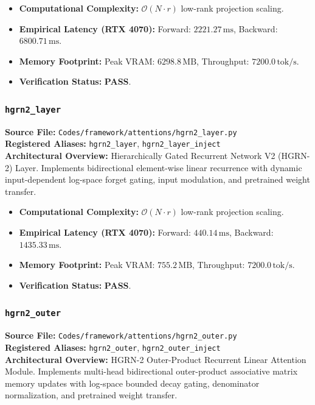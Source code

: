 \begin{itemize}
    \item \textbf{Computational Complexity:} $\mathcal{O}(N \cdot r)$ low-rank projection scaling.
    \item \textbf{Empirical Latency (RTX 4070):} Forward: $2221.27\,\text{ms}$, Backward: $6800.71\,\text{ms}$.
    \item \textbf{Memory Footprint:} Peak VRAM: $6298.8\,\text{MB}$, Throughput: $7200.0\,\text{tok/s}$.
    \item \textbf{Verification Status:} \textbf{PASS}.
\end{itemize}

\subsubsection{\texttt{hgrn2\_layer}}
\textbf{Source File:} \texttt{Codes/framework/attentions/hgrn2\_layer.py} \\
\textbf{Registered Aliases:} \texttt{hgrn2\_layer}, \texttt{hgrn2\_layer\_inject} \\
\textbf{Architectural Overview:} Hierarchically Gated Recurrent Network V2 (HGRN-2) Layer. Implements bidirectional element-wise linear recurrence with dynamic input-dependent log-space forget gating, input modulation, and pretrained weight transfer.

\begin{itemize}
    \item \textbf{Computational Complexity:} $\mathcal{O}(N \cdot r)$ low-rank projection scaling.
    \item \textbf{Empirical Latency (RTX 4070):} Forward: $440.14\,\text{ms}$, Backward: $1435.33\,\text{ms}$.
    \item \textbf{Memory Footprint:} Peak VRAM: $755.2\,\text{MB}$, Throughput: $7200.0\,\text{tok/s}$.
    \item \textbf{Verification Status:} \textbf{PASS}.
\end{itemize}

\subsubsection{\texttt{hgrn2\_outer}}
\textbf{Source File:} \texttt{Codes/framework/attentions/hgrn2\_outer.py} \\
\textbf{Registered Aliases:} \texttt{hgrn2\_outer}, \texttt{hgrn2\_outer\_inject} \\
\textbf{Architectural Overview:} HGRN-2 Outer-Product Recurrent Linear Attention Module. Implements multi-head bidirectional outer-product associative matrix memory updates with log-space bounded decay gating, denominator normalization, and pretrained weight transfer.


